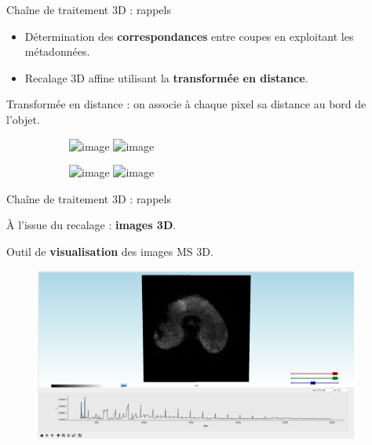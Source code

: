\documentclass[10pt]{beamer}
\begin{document}
\begin{frame}{Chaîne de traitement 3D : rappels}
  \begin{itemize}
  \item Détermination des \textbf{correspondances} entre coupes en exploitant les métadonnées.
  \item<2-> Recalage 3D affine utilisant la \textbf{transformée en distance}.
  \end{itemize}

   {
    \alert{Transformée en distance} : on associe à chaque pixel sa distance au bord de l'objet.

    \begin{figure}[ht]
      \centering
      \begin{subfigure}[t]{0.5\textwidth}
        \centering
        \includegraphics<1>[width=0.65\textwidth]{fig/mri_slice6.png}%
        \includegraphics<2>[width=0.65\textwidth]{fig/mri_slice6_dt.png}
        \caption{}
        \label{subfig:mri_slice6_dt.png}
      \end{subfigure}%
      \begin{subfigure}[t]{0.5\textwidth}
        \centering
        \includegraphics<1>[width=0.65\textwidth]{fig/maldi_slice6.png}%
        \includegraphics<2>[width=0.65\textwidth]{fig/maldi_slice6_dt.png}
        \caption{}
        \label{subfig:maldi_slice6_dt.png}
      \end{subfigure}%
    \end{figure}
  }
\end{frame}

\begin{frame}{Chaîne de traitement 3D : rappels}

  À l'issue du recalage : \textbf{images 3D}.

  Outil de \textbf{visualisation} des images MS 3D.

  \begin{figure}[ht]
    \centering
    \includegraphics[width=0.95\textwidth]{fig/visu}%
    \caption{}
    \label{fig:visu}
  \end{figure}


\end{frame}
\end{document}
